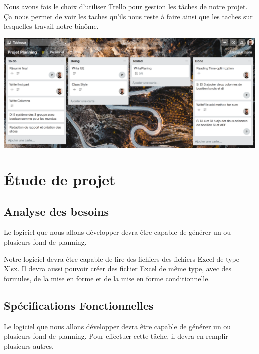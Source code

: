 \documentclass{polytech/polytech}
\begin{document}
	Nous avons fais le choix d'utiliser \href{https://trello.com/}{Trello} pour gestion les tâches de notre projet.
	Ça nous permet de voir les taches qu'ils nous reste à faire ainsi que les taches sur lesquelles travail notre binôme.

	\includegraphics[width=\textwidth]{./img/trello.png}
	\chapter{Étude de projet}
	\section{Analyse des besoins}

	Le logiciel que nous allons développer devra être capable de générer un ou plusieurs fond de planning.

	Notre logiciel devra être capable de lire des fichiers des fichiers Excel de type Xlsx.
	Il devra aussi pouvoir créer des fichier Excel de même type, avec des formules, de la mise en forme et de la mise en forme conditionnelle.

	\section{Spécifications Fonctionnelles}

	Le logiciel que nous allons développer devra être capable de générer un ou plusieurs fond de planning. Pour effectuer cette tâche, il devra en remplir plusieurs autres.
\end{document}
